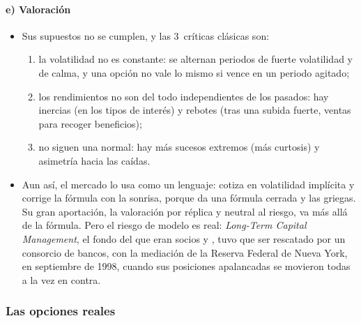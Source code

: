 \documentclass[11pt]{article}
\begin{document}
\paragraph{e) Valoración}

\begin{itemize}
\item Sus supuestos no se cumplen, y las 3~críticas clásicas son:
  \begin{enumerate}
  \item la volatilidad no es constante: se alternan periodos de fuerte volatilidad y de calma, y una opción no vale lo mismo si vence en un periodo agitado;
  \item los rendimientos no son del todo independientes de los pasados: hay inercias (en los tipos de interés) y rebotes (tras una subida fuerte, ventas para recoger beneficios);
  \item no siguen una normal: hay más sucesos extremos (más curtosis) y asimetría hacia las caídas.
  \end{enumerate}
\item Aun así, el mercado lo usa como un lenguaje: cotiza en volatilidad implícita y corrige la fórmula con la sonrisa, porque da una fórmula cerrada y las griegas. Su gran aportación, la valoración por réplica y neutral al riesgo, va más allá de la fórmula. Pero el riesgo de modelo es real: \emph{Long-Term Capital Management}, el fondo del que eran socios  y , tuvo que ser rescatado por un consorcio de bancos, con la mediación de la Reserva Federal de Nueva York, en septiembre de 1998, cuando sus posiciones apalancadas se movieron todas a la vez en contra\nocite{PWG1999LTCM}.
\end{itemize}

\subsubsection{Las opciones reales}\label{sec:opciones-reales}
\end{document}
